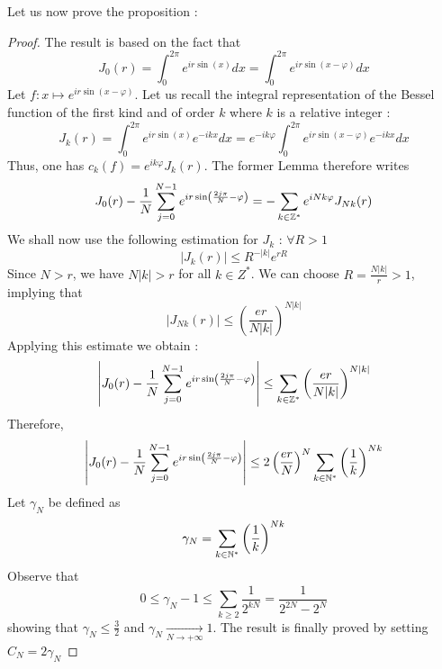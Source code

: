 \documentclass[11pt,a4paper]{article}
\begin{document}
Let us now prove the proposition : 
\begin{proof}
The result is based on the fact that \[J_0(r) =  \int_0^{2\pi} e^{ir\sin(x)}dx = \int_0^{2\pi} e^{ir\sin(x - \varphi)}dx\] Let $f : x \mapsto e^{ir\sin(x - \varphi)}$. Let us recall the integral representation of the Bessel function of the first kind and of order $k$ where $k$ is a relative integer : \[J_k(r) =  \int_{0}^{2\pi}e^{ir\sin(x)}e^{-ikx}dx =  e^{-ik\varphi}\int_{0}^{2\pi}e^{ir\sin(x - \varphi)}e^{-ikx}dx\] Thus, one has $c_k(f) = e^{ik\varphi}J_k(r)$. The former Lemma therefore writes \[J_0(r) -  \dfrac{1}{N}\sum_{j=0}^{N-1}e^{ir\sin\left(\frac{2j\pi}{N}-\varphi\right)} = -\sum_{k\in \mathbb{Z}^*}e^{iNk\varphi}J_{Nk}(r)\] We shall now use the following estimation for $J_k$ : $\forall R>1$ \[|J_k(r)| \leq R^{-|k|}e^{rR}\] Since $N > r$, we have $N|k|>r$ for all $k \in Z^*$. We can choose $R = \frac{N|k|}{r} >1$, implying that \[|J_{Nk}(r)|\leq \left(\dfrac{er}{N|k|}\right)^{N|k|} \] Applying this estimate we obtain : \[\left|J_0(r) -  \dfrac{1}{N}\sum_{j=0}^{N-1}e^{ir\sin\left(\frac{2j\pi}{N}-\varphi\right)}\right| \leq \sum_{k\in \mathbb{Z}^*} \left(\dfrac{er}{N|k|}\right)^{N|k|}\] Therefore, \[\left|J_0(r) -  \dfrac{1}{N}\sum_{j=0}^{N-1}e^{ir\sin\left(\frac{2j\pi}{N}-\varphi\right)}\right| \leq 2\left(\dfrac{er}{N}\right)^{N}\sum_{k\in \mathbb{N}^*} \left(\dfrac{1}{k}\right)^{Nk}\]
Let $\gamma_N$ be defined as \[\gamma_N = \sum_{k\in \mathbb{N}^*} \left(\dfrac{1}{k}\right)^{Nk}\] Observe that \[0 \leq \gamma_N -1 \leq \sum_{k\geq 2} \dfrac{1}{2^{kN}} = \dfrac{1}{2^{2N} - 2^N}\] showing that $\gamma_N \leq \frac{3}{2}$ and $\gamma_N \underset{N\to +\infty}{\longrightarrow} 1$. The result is finally proved by setting $C_N = 2\gamma_N$ 

\end{proof}
\end{document}
